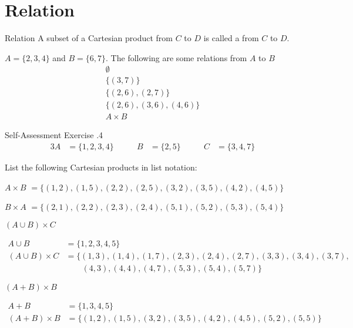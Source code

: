 \documentclass[\main/notes.tex]{subfiles}
\begin{document}
		\section{Relation}
			\begin{definition}{Relation}
				A subset of a Cartesian product from $C$ to $D$ is called a  from $C$ to $D$.
			\end{definition}
			\begin{example}
				$A = \{2, 3, 4\}$ and  $B = \{6, 7\}$. The following are some relations from $A$ to $B$
				\begin{align*}
					\emptyset \tag*{(This is a subset, even though it has no elements)}\\
					\bigl\{(3, 7)\bigr\}\\
					\bigl\{(2, 6), (2, 7)\bigr\}\\
					\bigl\{(2, 6), (3, 6), (4, 6)\bigr\}\\
					A \times B
				\end{align*}
			\end{example}
			\begin{exercise}{Self-Assessment Exercise \thechapter.4}
				\begin{alignat*}{3}
					A &= \{1, 2, 3, 4\} \qquad & B &= \{2, 5\} \qquad & C &= \{3, 4, 7\}
				\end{alignat*}
				\begin{questions}
				\item List the following Cartesian products in list notation:
					\begin{questions}
						\item $A \times B$ {\answer $= \bigl\{(1, 2), (1, 5), (2, 2), (2, 5), (3, 2), (3, 5), (4, 2), (4, 5)\bigr\}$ }
						\item $B \times A$ {\answer $= \bigl\{(2, 1), (2, 2), (2, 3), (2, 4), (5, 1), (5, 2), (5, 3), (5, 4)\bigr\}$ }
						\item $(A \cup B) \times C$
							\begin{answer}
								\begin{align*}
									A \cup B &= \{1, 2, 3, 4, 5\}\\
									(A \cup B) \times C &= \bigl\{(1, 3), (1, 4), (1, 7), (2, 3), (2, 4), (2, 7), (3, 3), (3, 4), (3, 7),\\
									& \qquad (4, 3), (4, 4), (4, 7), (5, 3), (5, 4), (5, 7)\bigr\}
								\end{align*}
							\end{answer}
						\item $(A + B) \times B$
							\begin{answer}
								\begin{align*}
									A + B &= \{1, 3, 4, 5\}\\
									(A + B) \times B &= \bigl\{(1, 2), (1, 5), (3, 2), (3, 5), (4, 2), (4, 5), (5, 2), (5, 5)\bigr\}
								\end{align*}
							\end{answer}
					\end{questions}
				\end{questions}
			\end{exercise}
			\pagebreak
\end{document}
